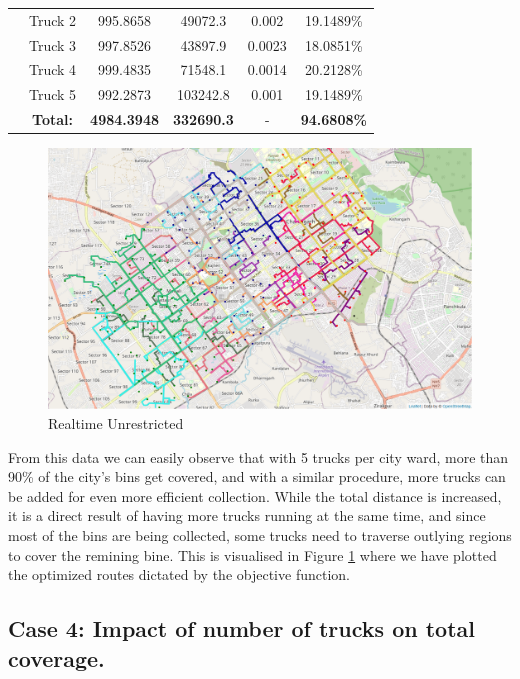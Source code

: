 \documentclass[12pt]{article}
\begin{document}
\begin{table}[H]
\begin{tabular}{|c|c|c|c|c|c|}
        \cline{2-6}& Truck 2 &995.8658&49072.3&0.002&19.1489\%\\        
        \cline{2-6}& Truck 3 &997.8526&43897.9&0.0023&18.0851\%\\        
        \cline{2-6}& Truck 4 &999.4835&71548.1&0.0014&20.2128\%\\
        \cline{2-6}& Truck 5 &992.2873&103242.8&0.001&19.1489\%\\
        \hline &\textbf{Total:} &\textbf{4984.3948} &\textbf{332690.3}&- &\textbf{94.6808\%}\\
        \hline      
    \end{tabular}
\end{table}

\begin{figure}[H]
    \centering
    \includegraphics[scale=0.4]{Dynamic5trucks.png}
    \caption{Realtime Unrestricted}\label{fig2}
\end{figure}

From this data we can easily observe that with 5 trucks per city ward, more than 90\% of the city's bins get covered, and with a similar procedure, more trucks can be added for even more efficient collection. While the total distance is increased, it is a direct result of having more trucks running at the same time, and since most of the bins are being collected, some trucks need to traverse outlying regions to cover the remining bine. This is visualised in Figure \ref{fig2} where we have plotted the optimized routes dictated by the objective function.

\subsection*{Case 4: Impact of number of trucks on total coverage.}
\end{document}
